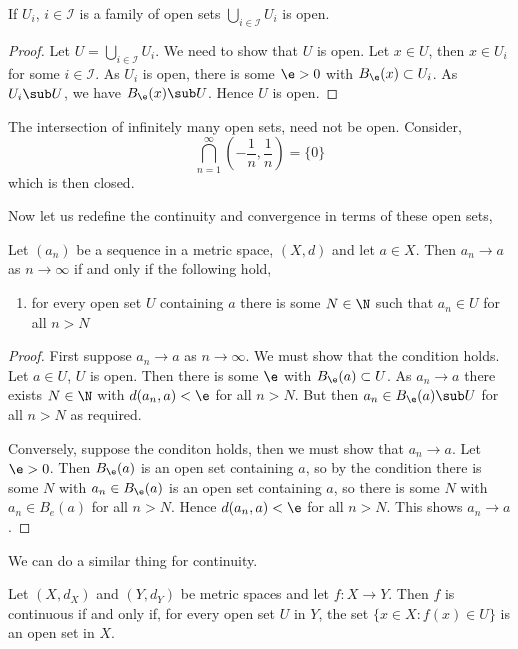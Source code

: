 \begin{nprop}
   If $U_i$, $i \in \mathcal{I}$ is a family of open sets $\bigcup_{i\in\mathcal{I}} U_i$ is open.
\end{nprop}
\begin{proof}
  Let $U = \bigcup_{i \in \mathcal{I}} U_i$. We need to show that $U$ is open. Let $x \in U$, then $x \in U_i$ for some $i \in \mathcal{I}$. As $U_i$ is open, there is some $\e > 0$ with $B_\e(x) \subset U_i$. As $U_i \sub U$, we have $B_\e(x) \sub U$. Hence $U$ is open.
\end{proof}

\noindent
The intersection of infinitely many open sets, need not be open. Consider,
$$ \bigcap_{n = 1}^\infty \left( -\frac{1}{n}, \frac{1}{n} \right) = \{0\}$$
which is then closed.

Now let us redefine the continuity and convergence in terms of these open sets,
\begin{ndefi}[Limit]
  Let $(a_n)$ be a sequence in a metric space, $(X, d)$ and let $a \in X$. Then $a_n \to a$ as $n \to \infty$ if and only if the following hold,
  \begin{enumerate}
    \item for every open set $U$ containing $a$ there is some $N \in \N$ such that $a_n \in U$ for all $n > N$
  \end{enumerate}
\end{ndefi}
\begin{proof}
  First suppose $a_n \to a$ as $n \to \infty$. We must show that the condition holds. Let $a \in U$, $U$ is open. Then there is some $\e$ with $B_\e(a) \subset U$. As $a_n \to a$ there exists $N \in \N$ with $d(a_n, a) < \e$ for all $n > N$. But then $a_n \in B_\e(a) \sub U$ for all $n > N$ as required.

  Conversely, suppose the conditon holds, then we must show that $a_n \to a$. Let $\e > 0$. Then $B_\e(a)$ is an open set containing $a$, so by the condition there is some $N$ with $a_n \in B_\e(a)$ is an open set containing $a$, so there is some $N$
 with $a_n \in B_e(a)$ for all $n > N$. Hence $d(a_n, a) < \e$ for all $n > N$. This shows $a_n \to a$.
\end{proof}

We can do a similar thing for continuity.
\begin{nprop}
   Let $(X, d_X)$ and $(Y, d_Y)$ be metric spaces and let $f : X \to Y$. Then $f$ is continuous if and only if, for every open set $U$ in $Y$, the set $\{x \in X : f(x) \in U\}$ is an open set in $X$.
\end{nprop}


